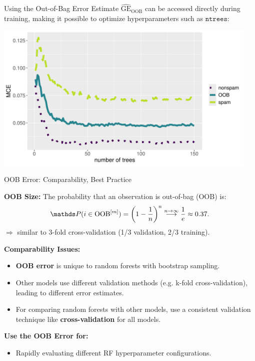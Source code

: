 \documentclass[11pt,compress,t,notes=noshow,xcolor=table]{beamer}
\begin{document}
\begin{vbframe}{Using the Out-of-Bag Error Estimate}
$\widehat{\mathrm{GE}}_{\text{OOB}}$ can be accessed directly during training, making it possible to optimize hyperparameters such as $\texttt{ntrees}$:

\vspace{1em}

\begin{knitrout}\scriptsize
{}\color{fgcolor}

{\centering \includegraphics[width=0.95\textwidth]{figure/forest-oob.pdf} 

}
\end{knitrout}

\end{vbframe}

\begin{vbframe}{OOB Error: Comparability, Best Practice}

\textbf{OOB Size:} The probability that an observation is out-of-bag (OOB) is:
$$\P(i \in \text{OOB}^{[m]}) = \left(1 - \frac{1}{n}\right)^n \stackrel{n \to \infty}{\longrightarrow} \frac{1}{e} \approx 0.37.$$
$\Rightarrow$ similar to 3-fold cross-validation (1/3 validation, 2/3 training).

\textbf{Comparability Issues:}
\begin{itemize}
\item \textbf{OOB error} is unique to random forests with bootstrap sampling.
\item Other models use different validation methods (e.g. k-fold cross-validation), leading to different error estimates.
\item For comparing random forests with other models, use a consistent validation technique like \textbf{cross-validation} for all models.
\end{itemize}

\textbf{Use the OOB Error for:}
\begin{itemize}
\item Rapidly evaluating different RF hyperparameter configurations.
\end{itemize}


\end{vbframe}

\endlecture
\end{document}

